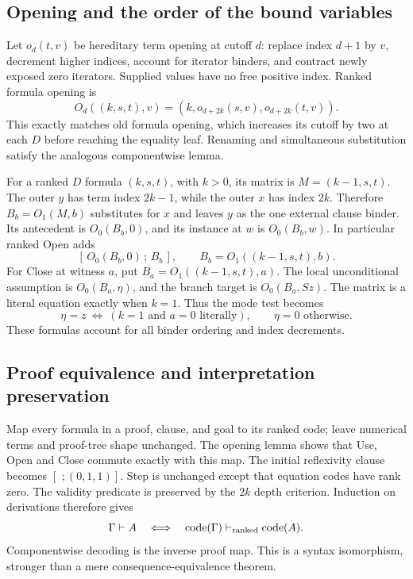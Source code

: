 \subsection{Opening and the order of the bound variables}
Let \(o_d(t,v)\) be hereditary term opening at cutoff \(d\): replace
index \(d+1\) by \(v\), decrement higher indices, account for iterator
binders, and contract newly exposed zero iterators. Supplied values have
no free positive index. Ranked formula opening is
\[
 O_d((k,s,t),v)
   =(k,o_{d+2k}(s,v),o_{d+2k}(t,v)).
\]
This exactly matches old formula opening, which increases its cutoff
by two at each \(D\) before reaching the equality leaf. Renaming and
simultaneous substitution satisfy the analogous componentwise lemma.

For a ranked \(D\) formula \((k,s,t)\), with \(k>0\), its matrix is
\(M=(k-1,s,t)\). The outer \(y\) has term index \(2k-1\), while the
outer \(x\) has index \(2k\). Therefore \(B_b=O_1(M,b)\) substitutes
for \(x\) and leaves \(y\) as the one external clause binder.
Its antecedent is \(O_0(B_b,0)\), and its instance at \(w\) is
\(O_0(B_b,w)\). In particular ranked Open adds
\[
 [\,O_0(B_b,0)\,;\,B_b\,],\qquad B_b=O_1((k-1,s,t),b).
\]
For Close at witness \(a\), put \(B_a=O_1((k-1,s,t),a)\).
The local unconditional assumption is \(O_0(B_a,\eta)\), and the
branch target is \(O_0(B_a,Sz)\). The matrix is a literal equation
exactly when \(k=1\). Thus the mode test becomes
\[
 \eta=z\ \Longleftrightarrow\ (k=1\text{ and }a=0\text{ literally}),
 \qquad \eta=0\text{ otherwise}.
\]
These formulas account for all binder ordering and index decrements.

\subsection{Proof equivalence and interpretation preservation}
Map every formula in a proof, clause, and goal to its ranked code;
leave numerical terms and proof-tree shape unchanged. The opening lemma
shows that Use, Open and Close commute exactly with this map.
The initial reflexivity clause becomes
\([\,\,;(0,1,1)]\).
Step is unchanged except that equation codes have rank zero.
The validity predicate is preserved by the \(2k\) depth criterion.
Induction on derivations therefore gives
\[
 \Gamma\vdash A\quad\Longleftrightarrow\quad
 \operatorname{code}(\Gamma)\vdash_{\rm ranked}\operatorname{code}(A).
\]
Componentwise decoding is the inverse proof map. This is a syntax
isomorphism, stronger than a mere consequence-equivalence theorem.

